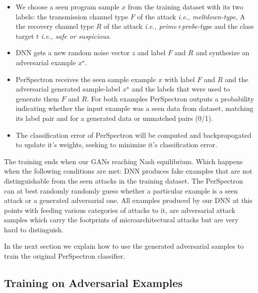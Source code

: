 \begin{itemize} [topsep=0pt,parsep=0pt,partopsep=0pt, label={--}, leftmargin=*]
\item We choose a seen program sample $x$ from the training dataset with its two labels: the transmission channel type $F$ of the attack {\em i.e., meltdown-type}, A the recovery channel type $R$ of the attack {\em i.e., prime+probe-type} and the class target $t$ {\em i.e., safe or suspicious}. 
 
\item DNN gets a new random noise vector $z$ and label $F$ and $R$ and  synthesize an adversarial example  $x^{\star}$.
 
\item PerSpectron receives the seen sample example $x$ with label $F$ and $R$ and  the adversarial generated sample-label $x^{\star}$ and the labels that were used to generate them $F$ and $R$. For both examples PerSpectron outputs a probability  indicating whether the input example was a seen data from dataset, matching its label pair and  for a generated data or unmatched pairs (0/1). 
 
\item The classification error of PerSpectron will be computed and backpropogated  to update it's weights, seeking to minimize it's classification error. 
 
\end{itemize}

% 
The training ends when our GANs reaching Nash equilibrium. Which happens when the following conditions are met: DNN produces fake examples that are not distinguishable from the seen attacks in the training dataset. The PerSpectron can at best randomly  randomly guess whether a particular example is a seen attack or a generated adversarial one. All examples produced by our DNN at this points with feeding various categories of attacks to it, are adversarial attack samples which carry the footprints of microarchitectural attacks but are very hard to distinguish. 


In the next section we explain how to use the generated adversarial samples to train the original PerSpectron classifier. 

\subsection{Training on Adversarial Examples}

